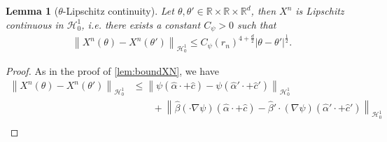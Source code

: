 \documentclass[11pt,a4paper,reqno]{amsart}
\numberwithin{equation}{section}
\theoremstyle{plain}
\newtheorem{lemma}[theorem]{Lemma}
\theoremstyle{definition}
\newcommand{\cH}{\mathcal{H}}
\newcommand{\R}{\mathbb{R}}
\newcommand{\norm}[1]{\left\|#1 \right\|} %
\newcommand{\abs}[1]{\left|#1\right|} %
\begin{document}
\begin{lemma}[$\theta$-Lipschitz continuity]
\label{lem:lip_Xtheta}
Let $\theta,\theta'\in \R\times\R\times\R^d$, then $X^n$ is Lipschitz continuous in $\cH_0^1$, \emph{i.e.} there exists a constant $C_\psi>0$ such that
\begin{align*}
    \norm{X^n(\theta) - X^n(\theta')}_{\cH_0^1} \le C_\psi \left(r_n\right)^{4+\frac{d}{2}}\abs{\theta-\theta'}^{\frac{1}{2}}.
\end{align*}
\end{lemma}

\begin{proof}
As in the proof of \cref{lem:boundXN}, we have
\begin{align}
\label{eq:appendix-bound}
\norm{X^n(\theta) - X^n\left( \theta'\right)}_{\cH_0^1} 
    &\le \norm{\psi \left( \hat\alpha \cdot + \hat c \right)-\psi \left( \hat\alpha' \cdot + \hat c'\right)}_{\cH_0^1} \nonumber \\ \nonumber
    &\qquad  +\norm{\hat\beta  \left( \cdot\nabla \psi \right) \left( \hat\alpha \cdot + \hat c \right)-\hat\beta' \cdot \left( \nabla \psi \right) \left( \hat\alpha' \cdot + \hat c' \right)}_{\cH_0^1} \\

\end{align}
\end{proof}
\end{document}
